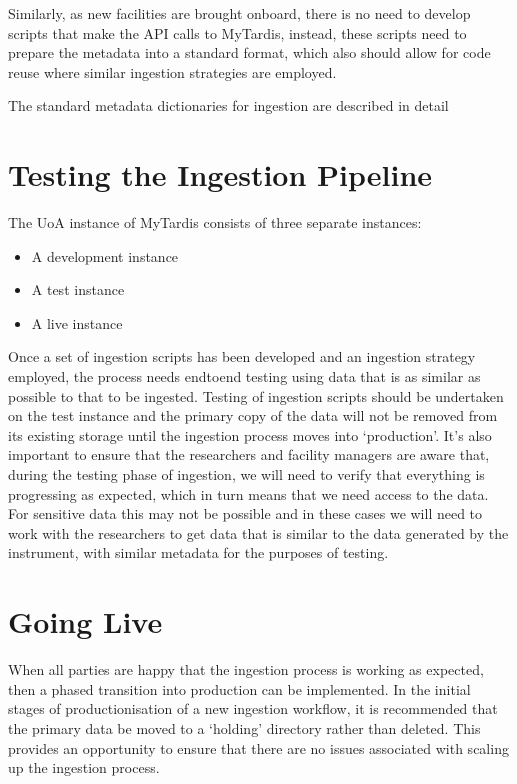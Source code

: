 \documentclass[letterpaper,10pt,english]{sphinxmanual}
\begin{document}
\sphinxAtStartPar
Similarly, as new facilities are brought onboard, there is no need to develop scripts that make the API calls to MyTardis, instead, these scripts need to prepare the metadata into a standard format, which also should allow for code reuse where similar ingestion strategies are employed.

\sphinxAtStartPar
The standard metadata dictionaries for ingestion are described in detail 


\section{Testing the Ingestion Pipeline}
\label{\detokenize{index:testing-the-ingestion-pipeline}}\label{\detokenize{index:testing}}
\sphinxAtStartPar
The UoA instance of MyTardis consists of three separate instances:
\begin{itemize}
\item {}
\sphinxAtStartPar
A development instance

\item {}
\sphinxAtStartPar
A test instance

\item {}
\sphinxAtStartPar
A live instance

\end{itemize}

\sphinxAtStartPar
Once a set of ingestion scripts has been developed and an ingestion strategy employed, the process needs end\sphinxhyphen{}to\sphinxhyphen{}end testing using data that is as similar as possible to that to be ingested. Testing of ingestion scripts should be undertaken on the test instance and the primary copy of the data will not be removed from its existing storage until the ingestion process moves into ‘production’. It’s also important to ensure that the researchers and facility managers are aware that, during the testing phase of ingestion, we will need to verify that everything is progressing as expected, which in turn means that we need access to the data. For sensitive data this may not be possible and in these cases we will need to work with the researchers to get data that is similar to the data generated by the instrument, with similar metadata for the purposes of testing.


\section{Going Live}
\label{\detokenize{index:going-live}}\label{\detokenize{index:id5}}
\sphinxAtStartPar
When all parties are happy that the ingestion process is working as expected, then a phased transition into production can be implemented. In the initial stages of productionisation of a new ingestion workflow, it is recommended that the primary data be moved to a ‘holding’ directory rather than deleted. This provides an opportunity to ensure that there are no issues associated with scaling up the ingestion process.
\end{document}
